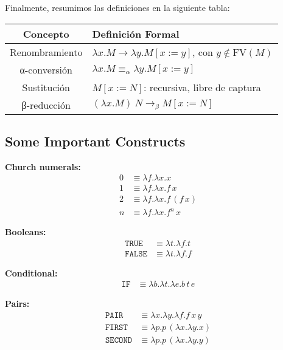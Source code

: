 \documentclass[12pt]{book}
\theoremstyle{plain}
\theoremstyle{definition}
\theoremstyle{definition}
\theoremstyle{definition}
\begin{document}
Finalmente, resumimos las definiciones en la siguiente tabla:

\begin{center}
\begin{tabular}{|c|l|}
\hline
\textbf{Concepto} & \textbf{Definición Formal} \\
\hline
Renombramiento & \( \lambda x. M \to \lambda y. M[x := y] \), con \( y \notin \mathrm{FV}(M) \) \\
\hline
α-conversión & \( \lambda x. M \equiv_\alpha \lambda y. M[x := y] \) \\
\hline
Sustitución & \( M[x := N] \): recursiva, libre de captura \\
\hline
β-reducción & \( (\lambda x. M)\ N \rightarrow_\beta M[x := N] \) \\
\hline
\end{tabular}
\end{center}











\newpage
\subsection{\centering Some Important Constructs}

\textbf{Church numerals:}
\begin{align*}
0 &\equiv \lambda f.\lambda x. x \\
1 &\equiv \lambda f.\lambda x. f\,x \\
2 &\equiv \lambda f.\lambda x. f\,(f\,x) \\
n &\equiv \lambda f.\lambda x. f^n\,x
\end{align*}

\textbf{Booleans:}
\begin{align*}
\texttt{TRUE} &\equiv \lambda t.\lambda f. t \\
\texttt{FALSE} &\equiv \lambda t.\lambda f. f
\end{align*}

\textbf{Conditional:}
\begin{align*}
\texttt{IF} &\equiv \lambda b.\lambda t.\lambda e. b\,t\,e
\end{align*}

\textbf{Pairs:}
\begin{align*}
\texttt{PAIR} &\equiv \lambda x.\lambda y.\lambda f. f\,x\,y \\
\texttt{FIRST} &\equiv \lambda p. p\,(\lambda x.\lambda y. x) \\
\texttt{SECOND} &\equiv \lambda p. p\,(\lambda x.\lambda y. y)
\end{align*}
\end{document}
